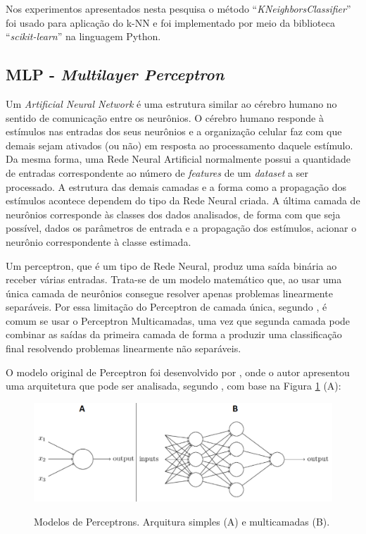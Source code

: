Nos experimentos apresentados nesta pesquisa o método ``\textit{KNeighborsClassifier}'' foi usado  para aplicação do k-NN e foi implementado por meio da biblioteca ``\textit{scikit-learn}'' na linguagem Python.





\subsection{MLP - \textit{Multilayer Perceptron}}
\label{nn}
Um \textit{Artificial Neural Network} é uma estrutura similar ao cérebro humano no sentido de comunicação entre os neurônios. O cérebro humano responde à estímulos nas entradas dos seus neurônios e a organização celular faz com que demais sejam ativados (ou não) em resposta ao processamento daquele estímulo. Da mesma forma, uma Rede Neural Artificial normalmente possui a quantidade de entradas correspondente ao número de \textit{features} de um \textit{dataset} a ser processado. A estrutura das demais camadas e a forma como a propagação dos estímulos acontece dependem do tipo da Rede Neural criada. A última camada de neurônios corresponde às classes dos dados analisados, de forma com que seja possível, dados os parâmetros de entrada e a propagação dos estímulos, acionar o neurônio correspondente à classe estimada.

Um perceptron, que é um tipo de Rede Neural, produz uma saída binária ao receber várias entradas. Trata-se de um modelo matemático que, ao usar uma única camada de neurônios consegue resolver apenas problemas linearmente separáveis. Por essa limitação do Perceptron de camada única, segundo , é comum se usar o Perceptron Multicamadas, uma vez que segunda camada pode combinar as saídas da primeira camada de forma a produzir uma classificação final resolvendo problemas linearmente não separáveis.

O modelo original de Perceptron foi desenvolvido por , onde o autor apresentou uma arquitetura que pode ser analisada, segundo , com base na Figura \ref{fig:percep} (A):

\begin{figure}[H]
\centering
\caption{Modelos de Perceptrons. Arquitura simples (A) e multicamadas (B).}
\includegraphics[width=\textwidth,keepaspectratio]{figs/perceptrons.png}
\newline{}\label{fig:percep}
\end{figure}

